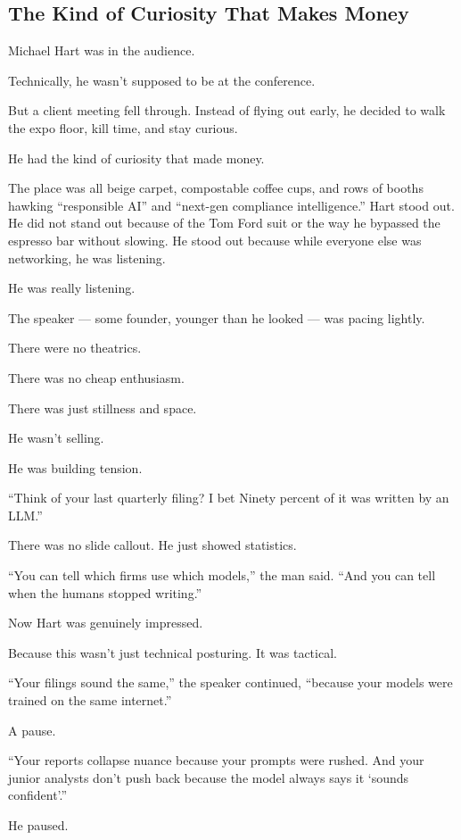\subsection{The Kind of Curiosity That Makes Money}

Michael Hart was in the audience.

Technically, he wasn’t supposed to be at the conference.

But a client meeting fell through. Instead of flying out early, he decided to walk the expo floor, 
kill time, and stay curious. 

He had the kind of curiosity that made money.

The place was all beige carpet, compostable coffee cups, and rows of booths hawking ``responsible AI''
and ``next-gen compliance intelligence.'' Hart stood out. He did not stand out because of the Tom Ford suit 
or the way he bypassed the espresso bar without slowing. 
He stood out because while everyone else was networking, he was listening.

He was really listening.

The speaker --- some founder, younger than he looked --- was pacing lightly. 

There were no theatrics. 

There was no cheap enthusiasm. 

There was just stillness and space. 

He wasn’t selling. 

He was building tension.

``Think of your last quarterly filing? I bet Ninety percent of it was written by an LLM.''

There was no slide callout. 
He just showed statistics.

``You can tell which firms use which models,'' the man said. ``And you can tell when the humans stopped writing.''

Now Hart was genuinely impressed.

Because this wasn’t just technical posturing. 
It was tactical.

``Your filings sound the same,'' 
the speaker continued, 
``because your models were trained on the same internet.'' 

A pause.

``Your reports collapse nuance because your prompts were rushed. 
And your junior analysts don’t push back because the model always says it `sounds confident'.''

He paused.

